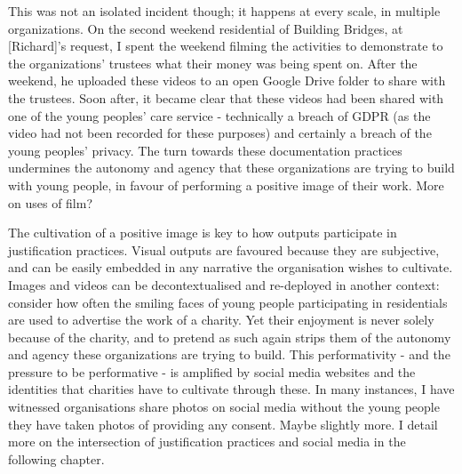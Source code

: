 This was not an isolated incident though; it happens at every scale, in multiple organizations. On the second weekend residential of Building Bridges, at [Richard]'s request, I spent the weekend filming the activities to demonstrate to the organizations’ trustees what their money was being spent on. After the weekend, he uploaded these videos to an open Google Drive folder to share with the trustees. Soon after, it became clear that these videos had been shared with one of the young peoples’ care service - technically a breach of GDPR (as the video had not been recorded for these purposes) and certainly a breach of the young peoples’ privacy. The turn towards these documentation practices undermines the autonomy and agency that these organizations are trying to build with young people, in favour of performing a positive image of their work. More on uses of film?

The cultivation of a positive image is key to how outputs participate in justification practices. Visual outputs are favoured because they are subjective, and can be easily embedded in any narrative the organisation wishes to cultivate. Images and videos can be decontextualised and re-deployed in another context: consider how often the smiling faces of young people participating in residentials are used to advertise the work of a charity. Yet their enjoyment is never solely because of the charity, and to pretend as such again strips them of the autonomy and agency these organizations are trying to build. This performativity - and the pressure to be performative - is amplified by social media websites and the identities that charities have to cultivate through these. In many instances, I have witnessed organisations share photos on social media without the young people they have taken photos of providing any consent. Maybe slightly more. I detail more on the intersection of justification practices and social media in the following chapter.

